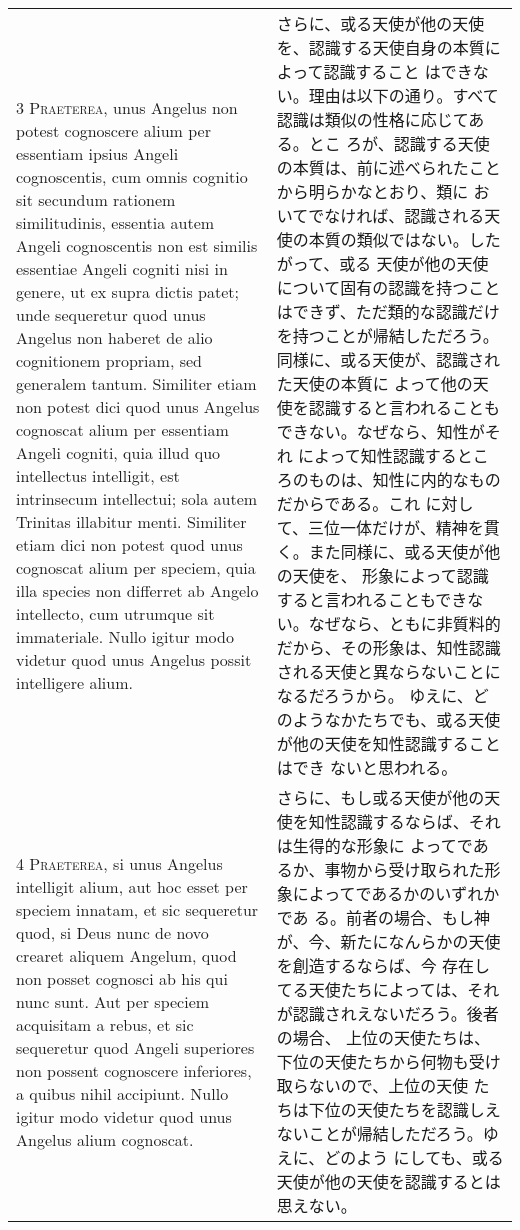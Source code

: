 \documentclass[10pt]{jsarticle} %
\begin{document}
\begin{longtable}{p{21em}p{21em}}
{\scshape 3 Praeterea}, unus Angelus non potest
cognoscere alium per essentiam ipsius Angeli cognoscentis, cum omnis
cognitio sit secundum rationem similitudinis, essentia autem Angeli
cognoscentis non est similis essentiae Angeli cogniti nisi in genere, ut
ex supra dictis patet; unde sequeretur quod unus Angelus non haberet de
alio cognitionem propriam, sed generalem tantum. Similiter etiam non
potest dici quod unus Angelus cognoscat alium per essentiam Angeli
cogniti, quia illud quo intellectus intelligit, est intrinsecum
intellectui; sola autem Trinitas illabitur menti. Similiter etiam dici
non potest quod unus cognoscat alium per speciem, quia illa species non
differret ab Angelo intellecto, cum utrumque sit immateriale. Nullo
igitur modo videtur quod unus Angelus possit intelligere alium.


&

さらに、或る天使が他の天使を、認識する天使自身の本質によって認識すること
 はできない。理由は以下の通り。すべて認識は類似の性格に応じてある。とこ
 ろが、認識する天使の本質は、前に述べられたことから明らかなとおり、類に
 おいてでなければ、認識される天使の本質の類似ではない。したがって、或る
 天使が他の天使について固有の認識を持つことはできず、ただ類的な認識だけ
 を持つことが帰結しただろう。同様に、或る天使が、認識された天使の本質に
 よって他の天使を認識すると言われることもできない。なぜなら、知性がそれ
 によって知性認識するところのものは、知性に内的なものだからである。これ
 に対して、三位一体だけが、精神を貫く。また同様に、或る天使が他の天使を、
 形象によって認識すると言われることもできない。なぜなら、ともに非質料的
 だから、その形象は、知性認識される天使と異ならないことになるだろうから。
ゆえに、どのようなかたちでも、或る天使が他の天使を知性認識することはでき
 ないと思われる。

\\


{\scshape 4 Praeterea}, si unus Angelus intelligit
alium, aut hoc esset per speciem innatam, et sic sequeretur quod, si
Deus nunc de novo crearet aliquem Angelum, quod non posset cognosci ab
his qui nunc sunt. Aut per speciem acquisitam a rebus, et sic sequeretur
quod Angeli superiores non possent cognoscere inferiores, a quibus nihil
accipiunt. Nullo igitur modo videtur quod unus Angelus alium cognoscat.


&

さらに、もし或る天使が他の天使を知性認識するならば、それは生得的な形象に
 よってであるか、事物から受け取られた形象によってであるかのいずれかであ
 る。前者の場合、もし神が、今、新たになんらかの天使を創造するならば、今
 存在してる天使たちによっては、それが認識されえないだろう。後者の場合、
 上位の天使たちは、下位の天使たちから何物も受け取らないので、上位の天使
 たちは下位の天使たちを認識しえないことが帰結しただろう。ゆえに、どのよう
 にしても、或る天使が他の天使を認識するとは思えない。


\end{longtable}
\end{document}
